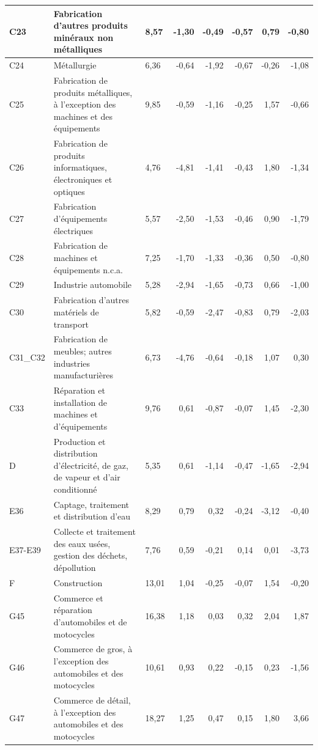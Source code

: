\begin{small}
\begin{longtable}{m{1.3cm}m{5.7cm}m{1cm}rrrrr}
	\hline
	C23 & Fabrication d'autres produits minéraux non métalliques & 8,57 & -1,30 & -0,49 & -0,57 & 0,79 & -0,80 \\ 
	\hline
	C24 & Métallurgie & 6,36 & -0,64 & -1,92 & -0,67 & -0,26 & -1,08 \\ 
	\hline
	C25 & Fabrication de produits métalliques, à l'exception des machines et des équipements & 9,85 & -0,59 & -1,16 & -0,25 & 1,57 & -0,66 \\ 
	\hline
	C26 & Fabrication de produits informatiques, électroniques et optiques & 4,76 & -4,81 & -1,41 & -0,43 & 1,80 & -1,34 \\ 
	\hline
	C27 & Fabrication d'équipements électriques & 5,57 & -2,50 & -1,53 & -0,46 & 0,90 & -1,79 \\ 
	\hline
	C28 & Fabrication de machines et équipements n.c.a. & 7,25 & -1,70 & -1,33 & -0,36 & 0,50 & -0,80 \\ 
	\hline
	C29 & Industrie automobile & 5,28 & -2,94 & -1,65 & -0,73 & 0,66 & -1,00 \\ 
	\hline
	C30 & Fabrication d'autres matériels de transport & 5,82 & -0,59 & -2,47 & -0,83 & 0,79 & -2,03 \\ 
	\hline
	C31\_C32 & Fabrication de meubles; autres industries manufacturières & 6,73 & -4,76 & -0,64 & -0,18 & 1,07 & 0,30 \\ 
	\hline
	C33 & Réparation et installation de machines et d'équipements & 9,76 & 0,61 & -0,87 & -0,07 & 1,45 & -2,30 \\ 
	\hline
	D & Production et distribution d'électricité, de gaz, de vapeur et d'air conditionné & 5,35 & 0,61 & -1,14 & -0,47 & -1,65 & -2,94 \\ 
	\hline
	E36 & Captage, traitement et distribution d'eau & 8,29 & 0,79 & 0,32 & -0,24 & -3,12 & -0,40 \\ 
	\hline
	E37-E39 & Collecte et traitement des eaux usées, gestion des déchets, dépollution & 7,76 & 0,59 & -0,21 & 0,14 & 0,01 & -3,73 \\ 
	\hline
	F & Construction & 13,01 & 1,04 & -0,25 & -0,07 & 1,54 & -0,20 \\ 
	\hline
	G45 & Commerce et réparation d'automobiles et de motocycles & 16,38 & 1,18 & 0,03 & 0,32 & 2,04 & 1,87 \\ 
	\hline
	G46 & Commerce de gros, à l'exception des automobiles et des motocycles & 10,61 & 0,93 & 0,22 & -0,15 & 0,23 & -1,56 \\ 
	\hline
	G47 & Commerce de détail, à l'exception des automobiles et des motocycles & 18,27 & 1,25 & 0,47 & 0,15 & 1,80 & 3,66 \\ 

\end{longtable}
\end{small}
